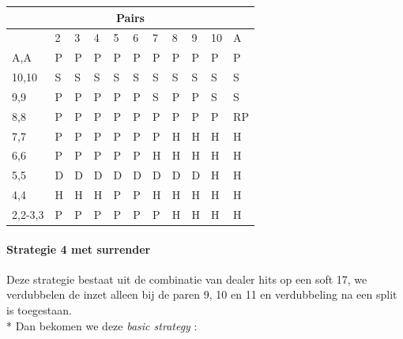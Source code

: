\documentclass[conference]{IEEEtran}
\begin{document}
\begin{table}[ht]
\begin{tabular}{|l|l|l|l|l|l|l|l|l|l|l|}
\multicolumn{11}{|c|}{\textbf{Pairs}}                                 \\ \hline
                             & 2 & 3 & 4 & 5 & 6 & 7 & 8 & 9 & 10 & A \\ \hline
A,A                          & P & P & P & P & P & P & P & P & P & P  \\ \hline
10,10                        & S & S & S & S & S & S & S & S & S & S  \\ \hline
9,9                          & P & P & P & P & P & S & P & P & S & S  \\ \hline
8,8                          & P & P & P & P & P & P & P & P & P & RP  \\ \hline
7,7                          & P & P & P & P & P & P & H & H & H & H  \\ \hline
6,6                          & P & P & P & P & P & H & H & H & H & H  \\ \hline
5,5                          & D & D & D & D & D & D & D & D & H & H  \\ \hline
4,4                          & H & H & H & P & P & H & H & H & H & H  \\ \hline
2,2-3,3                      & P & P & P & P & P & P & H & H & H & H  \\ \hline
\end{tabular}
\end{table}


\paragraph{Strategie 4 met surrender}

Deze strategie bestaat uit de combinatie van dealer hits op een soft 17, we verdubbelen de inzet alleen bij de paren 9, 10 en 11 en verdubbeling na een split is toegestaan.\\*
Dan bekomen we deze \textit{basic strategy} :
\end{document}
